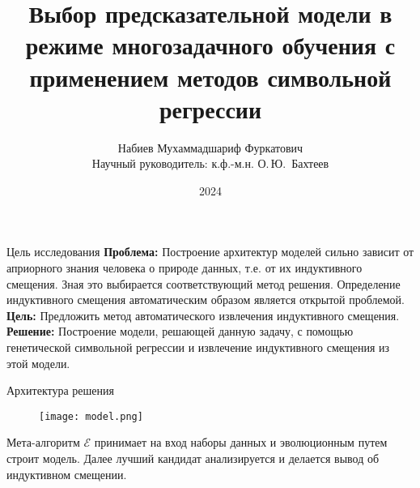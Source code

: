 \documentclass{beamer}
\title[\hbox to 56mm{Декодирование мозговых сигналов}]{Выбор предсказательной модели в режиме многозадачного обучения с применением методов символьной регрессии}
\author[М.\,Ф. Набиев]{
    Набиев Мухаммадшариф Фуркатович \\
    Научный руководитель: к.ф.-м.н. О.\,Ю.~Бахтеев
}
\institute[Московский физико-технический институт]{
\small{
    Московский физико-технический институт \\
    Кафедра интеллектуальных систем ФПМИ МФТИ 
}}
\date{2024}
\begin{document}
\begin{frame}
\thispagestyle{empty}
\maketitle
\end{frame}
\begin{frame}{Цель исследования}
\textbf{Проблема:} Построение архитектур моделей сильно зависит от априорного знания человека о природе данных, т.е. от их индуктивного смещения. Зная это выбирается соответствующий метод решения. Определение индуктивного смещения автоматическим образом является открытой проблемой.
\newline 
\newline 
\textbf{Цель:} Предложить метод автоматического извлечения индуктивного смещения.
\newline
\newline
\textbf{Решение:} Построение модели, решающей данную задачу, с помощью генетической символьной регрессии и извлечение индуктивного смещения из этой модели.
\end{frame}
\begin{frame}{Архитектура решения}
\begin{figure}[t]
        \centering
        \texttt{[image: model.png]}
\end{figure}
Мета-алгоритм \(\mathcal{E}\) принимает на вход наборы данных и эволюционным путем строит модель. Далее лучший кандидат анализируется и делается вывод об индуктивном смещении.
\end{frame}
\end{document}
